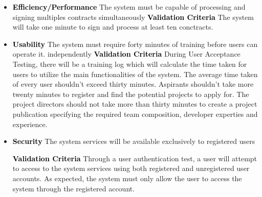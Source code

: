 \documentclass{scrreprt}
\begin{document}
    \begin{itemize}
        \item \textcolor{black}{\textbf{Efficiency/Performance}}\newline
        The system must be capable of processing and signing multiples contracts simultaneously \newline \newline
        \textcolor{black}{\textbf{Validation Criteria}} \newline
        The system will take one minute to sign and process at least ten conctracts.
        
        \item \textcolor{black}{\textbf{Usability}}\newline
        The system must require forty minutes of training before users can operate it. independently\newline\newline
        \textcolor{black}{\textbf {Validation Criteria}}\newline
        During User Acceptance Testing, there will be a training log which will calculate the time taken for users to utilize the main functionalities of the system. The average time taken of every user shouldn't exceed thirty minutes. \newline \newline
         Aspirants shouldn't take more twenty minutes to register and find the potential projects to apply for.\newline\newline
         The project directors should not take more than thirty minutes to create a project publication specifying the required team composition, developer experties and experience.
        \item \textcolor{black} {\textbf{Security}}\newline
        The system services will be available exclusively to registered users
        \newline
            
        \textcolor{black}{\textbf{Validation Criteria}}\newline
          Through a user authentication test, a user will attempt to access to the system services using both registered and unregistered user accounts. As expected, the system must only allow the user to access the system through the registered account.
            
    \end{itemize}
\end{document}
